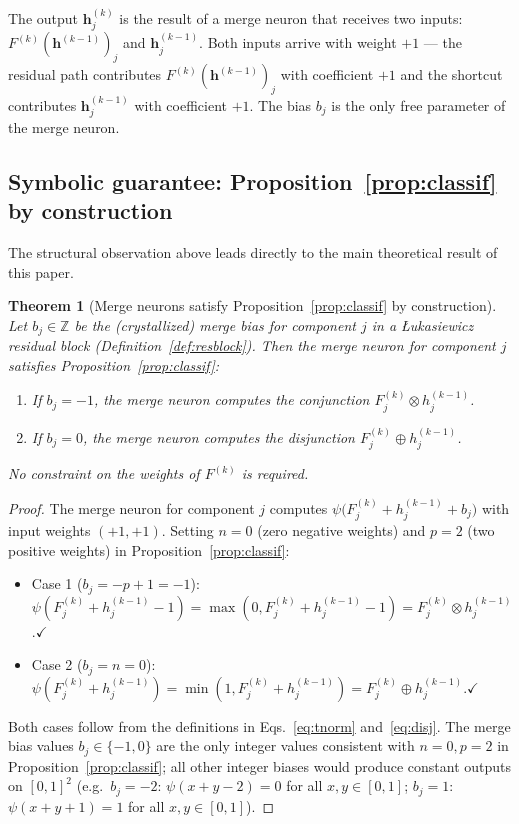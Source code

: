 \documentclass[12pt,a4paper]{article}
\newtheorem{theorem}{Theorem}
\newcommand{\tnorm}{\otimes}      %
\newcommand{\disj}{\oplus}        %
\begin{document}
The output $\mathbf{h}^{(k)}_j$ is the result of a merge neuron that receives
two inputs: $F^{(k)}(\mathbf{h}^{(k-1)})_j$ and $\mathbf{h}^{(k-1)}_j$.
Both inputs arrive with weight $+1$ --- the residual path contributes
$F^{(k)}(\mathbf{h}^{(k-1)})_j$ with coefficient $+1$ and the shortcut
contributes $\mathbf{h}^{(k-1)}_j$ with coefficient $+1$.
The bias $b_j$ is the only free parameter of the merge neuron.

\subsection{Symbolic guarantee: Proposition~\ref{prop:classif} by construction}
\label{ssec:res_theorem}

The structural observation above leads directly to the main theoretical result
of this paper.

\begin{theorem}[Merge neurons satisfy Proposition~\ref{prop:classif} by construction]
\label{thm:merge}
Let $b_j \in \mathbb{Z}$ be the (crystallized) merge bias for component $j$
in a \L{}ukasiewicz residual block (Definition~\ref{def:resblock}).
Then the merge neuron for component $j$ satisfies Proposition~\ref{prop:classif}:
\begin{enumerate}
  \item If $b_j = -1$, the merge neuron computes the conjunction
        $F^{(k)}_j \tnorm h^{(k-1)}_j$.
  \item If $b_j = 0$, the merge neuron computes the disjunction
        $F^{(k)}_j \disj h^{(k-1)}_j$.
\end{enumerate}
No constraint on the weights of $F^{(k)}$ is required.
\end{theorem}

\begin{proof}
The merge neuron for component $j$ computes
$\psi\bigl(F^{(k)}_j + h^{(k-1)}_j + b_j\bigr)$
with input weights $(+1, +1)$.
Setting $n = 0$ (zero negative weights) and $p = 2$ (two positive weights)
in Proposition~\ref{prop:classif}:
\begin{itemize}
  \item Case 1 ($b_j = -p + 1 = -1$):
    $\psi(F^{(k)}_j + h^{(k-1)}_j - 1)
     = \max(0, F^{(k)}_j + h^{(k-1)}_j - 1)
     = F^{(k)}_j \tnorm h^{(k-1)}_j$.\quad$\checkmark$
  \item Case 2 ($b_j = n = 0$):
    $\psi(F^{(k)}_j + h^{(k-1)}_j)
     = \min(1, F^{(k)}_j + h^{(k-1)}_j)
     = F^{(k)}_j \disj h^{(k-1)}_j$.\quad$\checkmark$
\end{itemize}
Both cases follow from the definitions in Eqs.~\eqref{eq:tnorm}
and~\eqref{eq:disj}.
The merge bias values $b_j \in \{-1, 0\}$ are the only integer values
consistent with $n=0, p=2$ in Proposition~\ref{prop:classif};
all other integer biases would produce constant outputs on $[0,1]^2$
(e.g.\ $b_j = -2$: $\psi(x+y-2) = 0$ for all $x,y \in [0,1]$;
$b_j = 1$: $\psi(x+y+1) = 1$ for all $x,y \in [0,1]$).
\end{proof}
\end{document}
